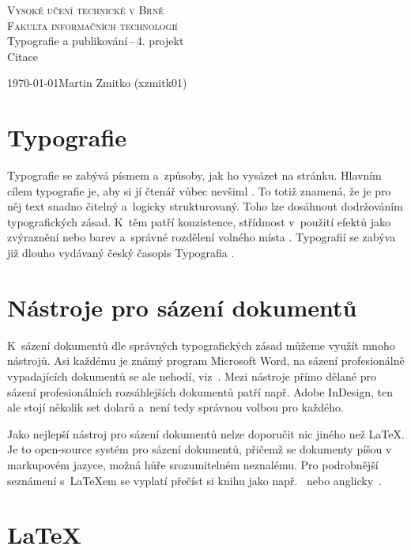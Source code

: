 \documentclass[11pt]{article}
\begin{document}
\begin{titlepage}
\begin{center}
{\Huge \textsc{Vysoké učení technické v Brně}\\
\bigskip
{\huge \textsc{Fakulta informačních technologií}}} \\
{\LARGE Typografie a publikování\,--\,4. projekt}\\
\medskip
{\Huge Citace} \\
\end{center}
{\Large \today \hfill Martin Zmitko (xzmitk01)}
\end{titlepage}

\section{Typografie}
Typografie se zabývá písmem a~způsoby, jak ho vysázet na stránku.
Hlavním cílem typografie je, aby si jí čtenář vůbec nevšiml \cite{May:2018}.
To totiž znamená, že je pro něj text snadno čitelný a~logicky strukturovaný.
Toho lze dosáhnout dodržováním typografických zásad.
K~těm patří konzistence, střídmost v~použití efektů jako zvýraznění nebo barev a~správné rozdělení volného místa \cite{Archer:2011}.
Typografií se zabýva již dlouho vydávaný český časopis Typografia \cite{Typografia}.

\section{Nástroje pro sázení dokumentů}
K~sázení dokumentů dle správných typografických zásad můžeme využít mnoho nástrojů.
Asi každému je známý program Microsoft Word, na sázení profesionálně vypadajících dokumentů se ale nehodí, viz~\cite{Freeman:2017}.
Mezi nástroje přímo dělané pro sázení profesionálních rozsáhlejších dokumentů patří např. Adobe InDesign, ten ale stojí několik set dolarů\cite{Reedsy:2018} a~není tedy správnou volbou pro každého.

Jako nejlepší nástroj pro sázení dokumentů nelze doporučit nic jiného než \LaTeX.
Je to open-source systém pro sázení dokumentů, přičemž se dokumenty píšou v markupovém jazyce, možná hůře srozumitelném neznalému.
Pro podrobnější seznámení s~\LaTeX em se vyplatí přečíst si knihu jako např.~\cite{Rybicka:2003} nebo anglicky~\cite{Lamport:1994}. 

\section{\LaTeX}
\end{document}

